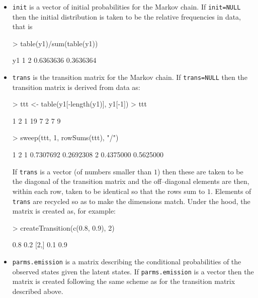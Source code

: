 \documentclass{article}
\def\code#1{\texttt{#1}}
\begin{document}
\begin{itemize}

\item \code{init} is a vector of initial probabilities for the Markov
chain. 
If \code{init=NULL} then the initial distribution is taken to be
the relative frequencies in data, that is
\begin{Schunk}
\begin{Sinput}
> table(y1)/sum(table(y1))
\end{Sinput}
\begin{Soutput}
y1
        1         2 
0.6363636 0.3636364 
\end{Soutput}
\end{Schunk}

\item \code{trans} is the transition matrix for the Markov chain.
If \code{trans=NULL} then the transition matrix is derived from data as:
\begin{Schunk}
\begin{Sinput}
> ttt <- table(y1[-length(y1)], y1[-1])
> ttt
\end{Sinput}
\begin{Soutput}
     1  2
  1 19  7
  2  7  9
\end{Soutput}
\begin{Sinput}
> sweep(ttt, 1, rowSums(ttt), "/")
\end{Sinput}
\begin{Soutput}
            1         2
  1 0.7307692 0.2692308
  2 0.4375000 0.5625000
\end{Soutput}
\end{Schunk}

If \code{trans} is a vector (of numbers smaller than $1$) then these
are taken to be the diagonal of the transition matrix and the
off--diagonal elements are then, within each row, taken to be
identical so that the rows sum to $1$. Elements of \code{trans} are
recycled so as to make the dimensions match. Under the hood, the
matrix is created as, for example:

\begin{Schunk}
\begin{Sinput}
> createTransition(c(0.8, 0.9), 2)
\end{Sinput}
\begin{Soutput}
     [,1] [,2]
[1,]  0.8  0.2
[2,]  0.1  0.9
\end{Soutput}
\end{Schunk}

\item \code{parms.emission} is a matrix describing the conditional
  probabilities of the observed states given the latent states. If
  \code{parms.emission} is a vector then the matrix is created
  following the same scheme as for the transition matrix described
  above. 



\end{itemize}
\end{document}
